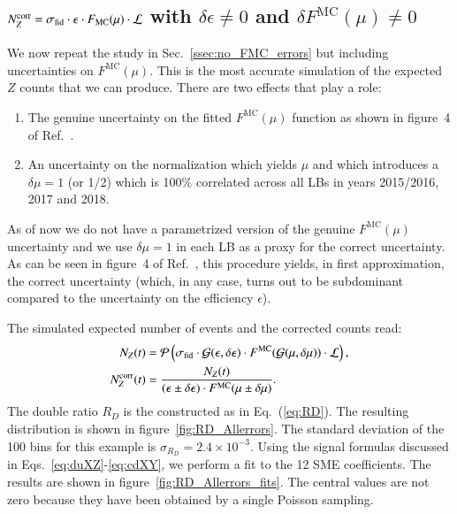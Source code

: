 \subsection{\texorpdfstring{
$N_Z^\text{corr} = \sigma_\text{fid} \cdot \epsilon \cdot F_\text{MC}(\mu)\cdot {\cal L}$ 
with $\delta \epsilon \neq 0$ and $\delta F^\text{MC}(\mu) \neq 0$}{NZcorr = sigmafid * epsilon * FMC * L with delta epsilon != 0 and delta FMC != 0}}
\label{ssec:all_errors_included}
%
We now repeat the study in Sec.~\ref{ssec:no_FMC_errors} but including uncertainties on $F^\text{MC}(\mu)$. This is the most accurate simulation of the expected $Z$ counts that we can produce. There are two effects that play a role: 
%
\begin{enumerate}
    \item The genuine uncertainty on the fitted $F^\text{MC}(\mu)$ function as shown in figure~4 of Ref.~\cite{ATL-DAPR-PUB-2021-001}.
    \item An uncertainty on the normalization which yields $\mu$ and which introduces a $\delta \mu = 1$ (or 1/2) which is 100\% correlated across all LBs in years 2015/2016, 2017 and 2018. 
\end{enumerate} 
%
As of now we do not have a parametrized version of the genuine $F^\text{MC}(\mu)$ uncertainty and we use $\delta \mu = 1$ in each LB as a proxy for the correct uncertainty. As can be seen in figure~4 of Ref.~\cite{ATL-DAPR-PUB-2021-001}, this procedure yields, in first approximation, the correct uncertainty (which, in any case, turns out to be subdominant compared to the uncertainty on the efficiency $\epsilon$). 

The simulated expected number of events and the corrected counts read:
%
\begin{align}
        N_Z (t)  & = {\cal P} \left( \sigma_\text{fid} \cdot {\cal G} (\epsilon,\delta\epsilon) \cdot F^\text{MC}({\cal G}(\mu,\delta \mu)) \cdot {\cal L}\right) , \label{eq:NZfull}\\
        N_Z^\text{corr} (t) & = \frac{N_Z(t)}{(\epsilon \pm \delta \epsilon) \cdot F^\text{MC}(\mu \pm \delta \mu)} .\label{eq:NZcorrfull}
    \end{align}
%
The double ratio $R_D$ is the constructed as in Eq.~(\ref{eq:RD}). The resulting distribution is shown in figure~\ref{fig:RD_Allerrors}. The standard deviation of the 100 bins for this example is $\sigma_{R_D} = 2.4 \times 10^{-3}$. Using the signal formulas discussed in Eqs.~\ref{eq:duXZ}-\ref{eq:cdXY}, we perform a fit to the 12 SME coefficients. The results are shown in figure~\ref{fig:RD_Allerrors_fits}. The central values are not zero because they have been obtained by a single Poisson sampling.

